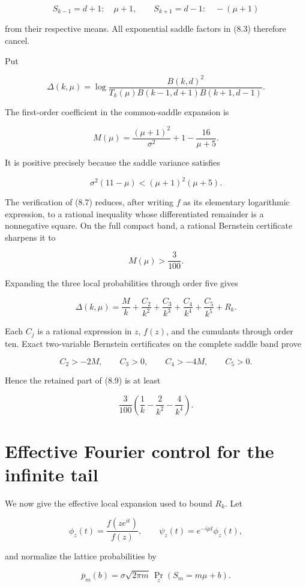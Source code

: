 \documentclass[11pt]{article}
\numberwithin{equation}{section}
\begin{document}
\[
S_{k-1}=d+1:\quad \mu+1,
\qquad
S_{k+1}=d-1:\quad -(\mu+1)
\tag{8.4}
\]

from their respective means. All exponential saddle factors in (8.3) therefore cancel.

Put

\[
\Delta(k,\mu)=
\log\frac{B(k,d)^2}
{T_k(\mu)B(k-1,d+1)B(k+1,d-1)}.
\tag{8.5}
\]

The first-order coefficient in the common-saddle expansion is

\[
M(\mu)=\frac{(\mu+1)^2}{\sigma^2}+1-\frac{16}{\mu+5}.
\tag{8.6}
\]

It is positive precisely because the saddle variance satisfies

\[
\sigma^2(11-\mu)<(\mu+1)^2(\mu+5).
\tag{8.7}
\]

The verification of (8.7) reduces, after writing $f$ as its elementary logarithmic
expression, to a rational inequality whose differentiated remainder is a nonnegative
square. On the full compact band, a rational Bernstein certificate sharpens it to

\[
M(\mu)>\frac3{100}.
\tag{8.8}
\]

Expanding the three local probabilities through order five gives

\[
\Delta(k,\mu)=
\frac{M}{k}+\frac{C_2}{k^2}+\frac{C_3}{k^3}
+\frac{C_4}{k^4}+\frac{C_5}{k^5}+R_k.
\tag{8.9}
\]

Each $C_j$ is a rational expression in $z$, $f(z)$, and the cumulants through order ten.
Exact two-variable Bernstein certificates on the complete saddle band prove

\[
C_2>-2M,
\qquad
C_3>0,
\qquad
C_4>-4M,
\qquad
C_5>0.
\tag{8.10}
\]

Hence the retained part of (8.9) is at least

\[
\frac3{100}\left(\frac1k-\frac2{k^2}-\frac4{k^4}\right).
\tag{8.11}
\]

\section{Effective Fourier control for the infinite tail}


We now give the effective local expansion used to bound $R_k$. Let

\[
\phi_z(t)=\frac{f(ze^{it})}{f(z)},
\qquad
\psi_z(t)=e^{-i\mu t}\phi_z(t),
\]

and normalize the lattice probabilities by

\[
\overline p_m(b)=
\sigma\sqrt{2\pi m}\,\Pr_z(S_m=m\mu+b).
\tag{9.1}
\]
\end{document}
